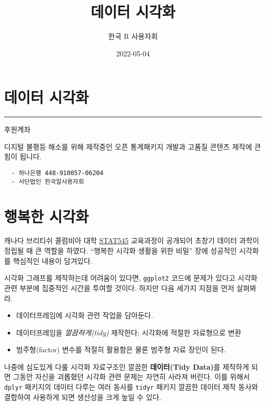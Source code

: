 \documentclass[
]{book}
\title{데이터 시각화}
\author{한국 R 사용자회}
\date{2022-05-04}
\providecommand{\tightlist}{%
  \setlength{\itemsep}{0pt}\setlength{\parskip}{0pt}}
\begin{document}
\maketitle

{
\setcounter{tocdepth}{1}
\tableofcontents
}
\hypertarget{uxb370uxc774uxd130-uxc2dcuxac01uxd654}{%
\chapter*{데이터 시각화}\label{uxb370uxc774uxd130-uxc2dcuxac01uxd654}}

\begin{center}\rule{0.5\linewidth}{0.5pt}\end{center}

후원계좌

디지털 불평등 해소를 위해 제작중인 오픈 통계패키지 개발과 고품질 콘텐츠 제작에 큰 힘이 됩니다.

\begin{verbatim}
  - 하나은행 448-910057-06204
  - 사단법인 한국알사용자회
\end{verbatim}

\hypertarget{happy-viz}{%
\chapter{행복한 시각화}\label{happy-viz}}

캐나다 브리티쉬 콜럼비아 대학 \href{https://stat545.com/}{STAT545} 교육과정이 공개되어
초창기 데이터 과학이 정립될 때 큰 역할을 하였다.
``행복한 시각화 생활을 위한 비밀'' 장에 성공적인 시각화를 핵심적인 내용이 담겨있다.

시각화 그래프를 제작하는데 어려움이 있다면,
\texttt{ggplot2} 코드에 문제가 있다고 시각화 관련 부분에 집중적인 시간을 투여할 것이다.
하지만 다음 세가지 지점을 먼저 살펴봐라.

\begin{itemize}
\tightlist
\item
  데이터프레임에 시각화 관련 작업을 담아둔다.
\item
  데이터프레임을 \emph{깔끔하게(tidy)} 제작한다; 시각화에 적절한 자료형으로 변환
\item
  범주형(factor) 변수를 적절히 활용함은 물론 범주형 자료 장인이 된다.
\end{itemize}

나중에 심도있게 다룰 시각화 자료구조인 깔끔한 \textbf{데이터(Tidy Data)}를 제작하게 되면
그동안 자신을 괴롭혔던 시각화 관련 문제는 자연히 사라져 버린다.
이를 위해서 \texttt{dplyr} 패키지의 데이터 다루는 여러 동사를 \texttt{tidyr} 패키지
깔끔한 데이터 제작 동사와 결합하여 사용하게 되면 생산성을 크게 높일 수 있다.
\end{document}
